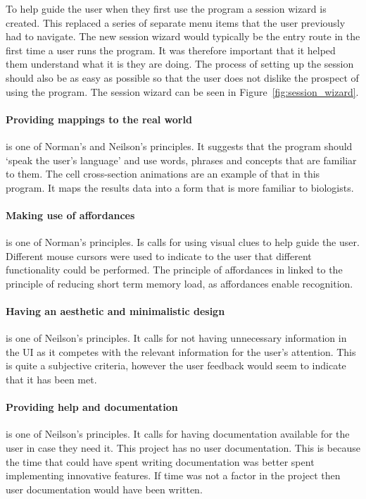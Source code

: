 To help guide the user when they first use the program a session wizard is created.  This replaced a series of separate menu items that the user previously had to navigate. The new session wizard would typically be the entry route in the first time a user runs the program.  It was therefore important that it helped them understand what it is they are doing.  The process of setting up the session should also be as easy as possible so that the user does not dislike the prospect of using the program.  The session wizard can be seen in Figure~\ref{fig:session_wizard}.

\paragraph*{Providing mappings to the real world} is one of Norman's and Neilson's principles.  It suggests that the program should `speak the user's language' and use words, phrases and concepts that are familiar to them.  The cell cross-section animations are an example of that in this program.  It maps the results data into a form that is more familiar to biologists.

\paragraph*{Making use of affordances} is one of Norman's principles.  Is calls for using visual clues to help guide the user.  Different mouse cursors were used to indicate to the user that different functionality could be performed.  The principle of affordances in linked to the principle of reducing short term memory load, as affordances enable recognition.

\paragraph*{Having an aesthetic and minimalistic design} is one of Neilson's principles.  It calls for not having unnecessary information in the \ac{UI} as it competes with the relevant information for the user's attention.  This is quite a subjective criteria, however the user feedback would seem to indicate that it has been met.

\paragraph*{Providing help and documentation} is one of Neilson's principles.  It calls for having documentation available for the user in case they need it.  This project has no user documentation.  This is because the time that could have spent writing documentation was better spent implementing innovative features.  If time was not a factor in the project then user documentation would have been written.

